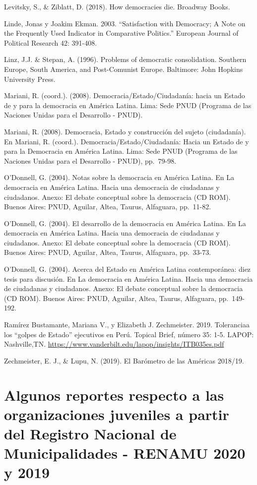\documentclass[
]{book}
\begin{document}
Levitsky, S., \& Ziblatt, D. (2018). How democracies die. Broadway Books.

Linde, Jonas y Joakim Ekman. 2003. ``Satisfaction with Democracy; A Note on the Frequently Used Indicator in Comparative Politics.'' European Journal of Political Research 42: 391-408.

Linz, J.J. \& Stepan, A. (1996). Problems of democratic consolidation. Southern Europe, South America, and Post-Comunist Europe. Baltimore: John Hopkins University Press.

Mariani, R. (coord.). (2008). Democracia/Estado/Ciudadanía: hacia un Estado de y para la democracia en América Latina. Lima: Sede PNUD (Programa de las Naciones Unidas para el Desarrollo - PNUD).

Mariani, R. (2008). Democracia, Estado y construcción del sujeto (ciudadanía). En Mariani, R. (coord.). Democracia/Estado/Ciudadanía: Hacia un Estado de y para la Democracia en América Latina. Lima: Sede PNUD (Programa de las Naciones Unidas para el Desarrollo - PNUD), pp.~79-98.

O'Donnell, G. (2004). Notas sobre la democracia en América Latina. En La democracia en América Latina. Hacia una democracia de ciudadanas y ciudadanos. Anexo: El debate conceptual sobre la democracia (CD ROM). Buenos Aires: PNUD, Aguilar, Altea, Taurus, Alfaguara, pp.~11-82.

O'Donnell, G. (2004). El desarrollo de la democracia en América Latina. En La democracia en América Latina. Hacia una democracia de ciudadanas y ciudadanos. Anexo: El debate conceptual sobre la democracia (CD ROM). Buenos Aires: PNUD, Aguilar, Altea, Taurus, Alfaguara, pp.~33-73.

O'Donnell, G. (2004). Acerca del Estado en América Latina contemporánea: diez tesis para discusión. En La democracia en América Latina. Hacia una democracia de ciudadanas y ciudadanos. Anexo: El debate conceptual sobre la democracia (CD ROM). Buenos Aires: PNUD, Aguilar, Altea, Taurus, Alfaguara, pp.~149-192.

Ramírez Bustamante, Mariana V., y Elizabeth J. Zechmeister. 2019. Toleranciaa los ``golpes de Estado'' ejecutivos en Perú. Topical Brief, número 35: 1-5. LAPOP: Nashville,TN.
\url{https://www.vanderbilt.edu/lapop/insights/ITB035es.pdf}

Zechmeister, E. J., \& Lupu, N. (2019). El Barómetro de las Américas 2018/19.

\hypertarget{orgJuveniles}{%
\chapter{Algunos reportes respecto a las organizaciones juveniles a partir del Registro Nacional de Municipalidades - RENAMU 2020 y 2019}\label{orgJuveniles}}
\end{document}
